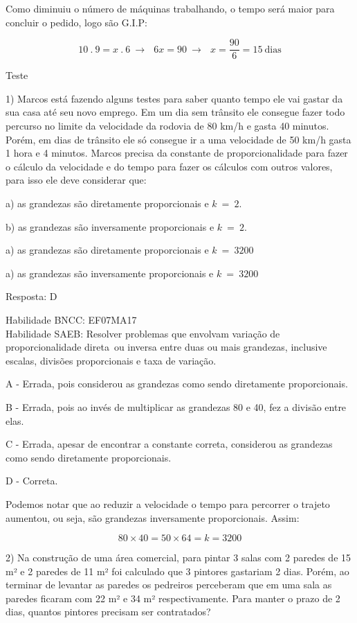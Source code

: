 Como diminuiu o número de máquinas trabalhando, o tempo será maior para
concluir o pedido, logo são G.I.P:

\[10\ .\ 9 = x\ .\ 6\  \rightarrow \ \ \ 6x = 90\  \rightarrow \ \ \ x = \frac{90}{6} = 15\ \text{dias}\]

Teste

1) Marcos está fazendo alguns testes para saber quanto tempo ele vai
gastar da sua casa até seu novo emprego. Em um dia sem trânsito ele
consegue fazer todo percurso no limite da velocidade da rodovia de 80
km/h e gasta 40 minutos. Porém, em dias de trânsito ele só consegue ir a
uma velocidade de 50 km/h gasta 1 hora e 4 minutos. Marcos precisa da
constante de proporcionalidade para fazer o cálculo da velocidade e do
tempo para fazer os cálculos com outros valores, para isso ele deve
considerar que:

a) as grandezas são diretamente proporcionais e \(k\  = \ 2\).

b) as grandezas são inversamente proporcionais e \(k\  = \ 2.\)

a) as grandezas são diretamente proporcionais e \(k\  = \ 3200\)

a) as grandezas são inversamente proporcionais e \(k\  = \ 3200\)

Resposta: D

Habilidade BNCC: EF07MA17\\
Habilidade SAEB: Resolver problemas que envolvam variação de
proporcionalidade direta~ou inversa entre duas ou mais grandezas,
inclusive escalas, divisões proporcionais e taxa de variação.

A - Errada, pois considerou as grandezas como sendo diretamente
proporcionais.

B - Errada, pois ao invés de multiplicar as grandezas 80 e 40, fez a
divisão entre elas.

C - Errada, apesar de encontrar a constante correta, considerou as
grandezas como sendo diretamente proporcionais.

D - Correta.

Podemos notar que ao reduzir a velocidade o tempo para percorrer o
trajeto aumentou, ou seja, são grandezas inversamente proporcionais.
Assim:

\[80 \times 40 = 50 \times 64 = k = 3200\]

2) Na construção de uma área comercial, para pintar 3 salas com 2
paredes de 15 m² e 2 paredes de 11 m² foi calculado que 3 pintores
gastariam 2 dias. Porém, ao terminar de levantar as paredes os pedreiros
perceberam que em uma sala as paredes ficaram com 22 m² e 34 m²
respectivamente. Para manter o prazo de 2 dias, quantos pintores
precisam ser contratados?

